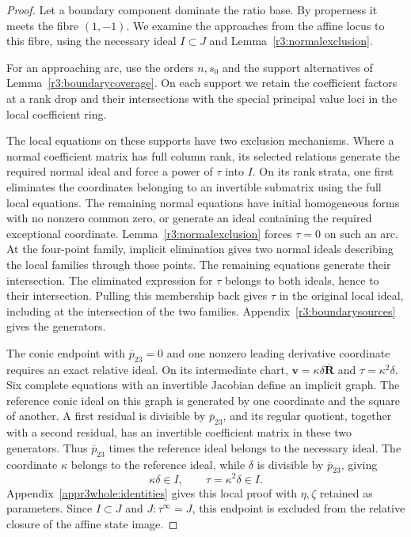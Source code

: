 \documentclass[11pt,a4paper]{article}
\numberwithin{equation}{section}
\theoremstyle{plain}
\theoremstyle{definition}
\theoremstyle{remark}
\begin{document}
\begin{proof}
Let a boundary component dominate the ratio base. By properness
it meets the fibre $(1,-1)$. We examine the approaches
from the affine locus to this fibre, using the necessary ideal
$I\subset J$ and Lemma~\ref{r3:normalexclusion}.

For an approaching arc, use the orders $n,s_0$ and the support
alternatives of Lemma~\ref{r3:boundarycoverage}. On each support
we retain the coefficient factors
at a rank drop and their intersections with the special
principal value loci in the local coefficient ring.

The local equations on these supports have two exclusion mechanisms.
Where a normal coefficient matrix has full column rank, its selected
relations generate the required normal ideal and force a power of
$\tau$ into $I$. On its rank strata, one first eliminates the coordinates belonging
to an invertible submatrix using the full local equations. The remaining normal equations
have initial homogeneous forms with no nonzero common zero, or
generate an ideal containing the required exceptional coordinate.
Lemma~\ref{r3:normalexclusion} forces $\tau=0$ on such an arc.
At the four-point family, implicit elimination gives two normal
ideals describing the local families through those points. The
remaining equations generate their intersection. The eliminated
expression for $\tau$ belongs to both ideals, hence to their
intersection. Pulling this membership back gives $\tau$ in the
original local ideal, including at the intersection of the two
families. Appendix~\ref{r3:boundarysources} gives the generators.

The conic endpoint with $\overline p_{23}=0$ and one nonzero
leading derivative coordinate requires an exact relative ideal.
On its intermediate chart,
$\boldsymbol v=\kappa\delta\overline{\boldsymbol R}$ and
$\tau=\kappa^2\delta$. Six complete equations with an invertible
Jacobian define an implicit graph. The reference conic ideal on
this graph is generated by one coordinate and the square of
another. A first residual is divisible by $\overline p_{23}$,
and its regular quotient, together with a second residual,
has an invertible coefficient matrix in these two generators.
Thus $\overline p_{23}$ times the reference ideal belongs to the
necessary ideal. The coordinate $\kappa$ belongs to the reference
ideal, while $\delta$ is divisible by $\overline p_{23}$, giving
\[
 \kappa\delta\in I,\qquad \tau=\kappa^2\delta\in I.
\]
Appendix~\ref{appr3whole:identities} gives this local proof with
$\eta,\zeta$ retained as parameters. Since $I\subset J$ and
$J:\tau^\infty=J$, this endpoint is excluded from the relative
closure of the affine state image.


\end{proof}
\end{document}

